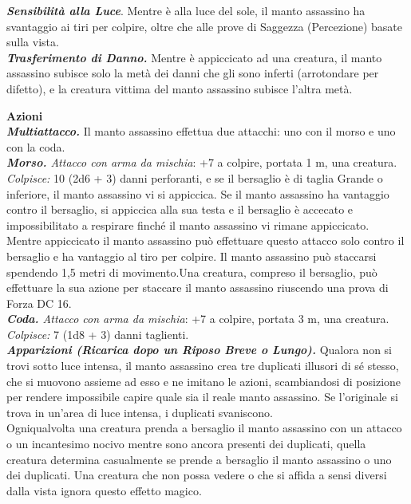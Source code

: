 \begin{multicols}{2}
\emph{\textbf{Sensibilità alla Luce}}. Mentre è alla luce del sole, il manto assassino ha svantaggio ai tiri per colpire, oltre che alle prove di Saggezza (Percezione) basate sulla vista.\\

\emph{\textbf{Trasferimento di Danno.}} Mentre è appiccicato ad una creatura, il manto assassino subisce solo la metà dei danni che gli sono inferti (arrotondare per difetto), e la creatura vittima del manto assassino subisce l'altra metà.

\smallskip\textbf{Azioni}\\

\emph{\textbf{Multiattacco.}} Il manto assassino effettua due attacchi: uno con il morso e uno con la coda.\\

\emph{\textbf{Morso.} Attacco con arma da mischia}: +7 a colpire, portata 1 m, una creatura.\\

\emph{Colpisce:} 10 (2d6 + 3) danni perforanti, e se il bersaglio è di taglia Grande o inferiore, il manto assassino vi si appiccica. Se il manto assassino ha vantaggio contro il bersaglio, si appiccica alla sua testa e il bersaglio è accecato e impossibilitato a respirare finché il manto assassino vi rimane appiccicato.\\
Mentre appiccicato il manto assassino può effettuare questo attacco solo  contro il bersaglio e ha vantaggio al tiro per colpire. Il manto assassino può staccarsi spendendo 1,5 metri di movimento.Una creatura, compreso il bersaglio, può effettuare la sua azione per  staccare il  manto assassino riuscendo una prova di Forza DC 16.\\

\emph{\textbf{Coda.} Attacco con arma da mischia}: +7 a colpire, portata 3 m, una creatura.\\
\emph{Colpisce:} 7 (1d8 + 3) danni taglienti.\\

\emph{\textbf{Apparizioni (Ricarica dopo un Riposo Breve o Lungo).}} Qualora non si trovi sotto luce intensa, il manto assassino crea tre duplicati illusori di sé stesso, che si muovono assieme ad esso e ne imitano le azioni, scambiandosi di posizione per rendere impossibile capire quale sia il reale manto assassino. Se l'originale si trova in un'area di luce intensa, i duplicati svaniscono. \\
Ogniqualvolta una creatura prenda a bersaglio il manto assassino con un attacco o un incantesimo nocivo mentre sono ancora presenti dei duplicati, quella creatura determina casualmente se prende a bersaglio il manto assassino o uno dei duplicati. Una creatura che non possa vedere o che si affida a sensi diversi dalla vista ignora questo effetto magico.\\


\end{multicols}
